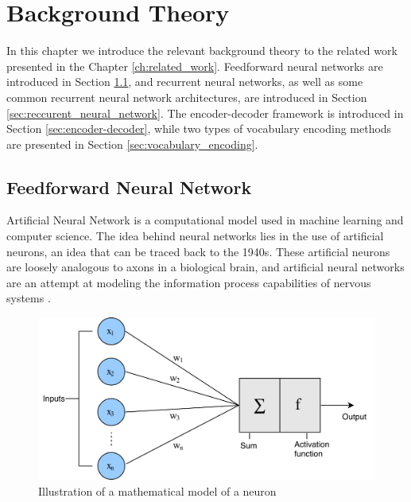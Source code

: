 
\chapter{Background Theory}
\label{ch:background}
In this chapter we introduce the relevant background theory to the related work presented in the Chapter \ref{ch:related_work}. Feedforward neural networks are introduced in Section \ref{sec:feedforward_neural_network}, and recurrent neural networks, as well as some common recurrent neural network architectures, are introduced in Section \ref{sec:reccurent_neural_network}. The encoder-decoder framework is introduced in Section \ref{sec:encoder-decoder}, while two types of vocabulary encoding methods are presented in Section \ref{sec:vocabulary_encoding}.


\section{Feedforward Neural Network}
\label{sec:feedforward_neural_network}
Artificial Neural Network is a computational model used in machine learning and computer science. The idea behind neural networks lies in the use of artificial neurons, an idea that can be traced back to the 1940s. These artificial neurons are loosely analogous to axons in a biological brain, and artificial neural networks are an attempt at modeling the information process capabilities of nervous systems \citep{russell2010aimodernapproach}.

\begin{figure}[ht]
    \centering
    \includegraphics[width=1\textwidth]{fig/related_work/perceptron.png}
    \caption{Illustration of a mathematical model of a neuron}
    \label{fig:nn-perceptron}
\end{figure}

